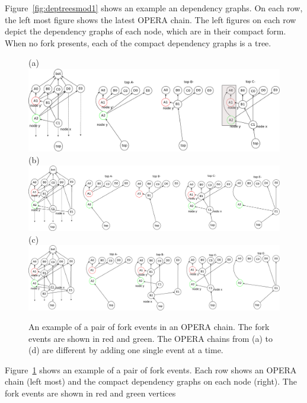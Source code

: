 \documentclass{article}
\begin{document}
Figure~\ref{fig:deptreesmod1} shows an example an dependency graphs. On each row, the left most figure shows the latest OPERA chain. The left figures on each row depict the dependency graphs of each node, which are in their compact form. When no fork presents, each of the compact dependency graphs is a tree.


\begin{figure}	\centering
	(a)\includegraphics[width=0.9\linewidth]{deptrees_fork}\\	(b)\includegraphics[width=0.9\linewidth]{deptrees_fork_add1event}\\
	(c)\includegraphics[width=0.9\linewidth]{deptrees_fork_add2event}
	\caption{An example of a pair of fork events in an OPERA chain. The fork events are shown in red and green. The OPERA chains from (a) to (d) are different by adding one single event at a time.}
	\label{fig:deptreesfork1}
\end{figure}

Figure~\ref{fig:deptreesfork1} shows an example of a pair of fork events. Each row shows an OPERA chain (left most) and the compact dependency graphs on each node (right). The fork events are shown in red and green vertices
\end{document}
